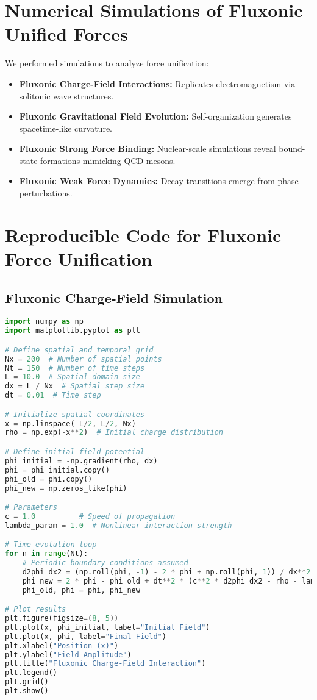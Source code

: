 \documentclass{article}
\begin{document}
\section{Numerical Simulations of Fluxonic Unified Forces}
We performed simulations to analyze force unification:
\begin{itemize}
    \item \textbf{Fluxonic Charge-Field Interactions:} Replicates electromagnetism via solitonic wave structures.
    \item \textbf{Fluxonic Gravitational Field Evolution:} Self-organization generates spacetime-like curvature.
    \item \textbf{Fluxonic Strong Force Binding:} Nuclear-scale simulations reveal bound-state formations mimicking QCD mesons.
    \item \textbf{Fluxonic Weak Force Dynamics:} Decay transitions emerge from phase perturbations.
\end{itemize}

\section{Reproducible Code for Fluxonic Force Unification}
\subsection{Fluxonic Charge-Field Simulation}
\begin{lstlisting}[language=Python, caption=Fluxonic Charge-Field Simulation, label=lst:charge]
import numpy as np
import matplotlib.pyplot as plt

# Define spatial and temporal grid
Nx = 200  # Number of spatial points
Nt = 150  # Number of time steps
L = 10.0  # Spatial domain size
dx = L / Nx  # Spatial step size
dt = 0.01  # Time step

# Initialize spatial coordinates
x = np.linspace(-L/2, L/2, Nx)
rho = np.exp(-x**2)  # Initial charge distribution

# Define initial field potential
phi_initial = -np.gradient(rho, dx)
phi = phi_initial.copy()
phi_old = phi.copy()
phi_new = np.zeros_like(phi)

# Parameters
c = 1.0          # Speed of propagation
lambda_param = 1.0  # Nonlinear interaction strength

# Time evolution loop
for n in range(Nt):
    # Periodic boundary conditions assumed
    d2phi_dx2 = (np.roll(phi, -1) - 2 * phi + np.roll(phi, 1)) / dx**2
    phi_new = 2 * phi - phi_old + dt**2 * (c**2 * d2phi_dx2 - rho - lambda_param * phi**3)
    phi_old, phi = phi, phi_new

# Plot results
plt.figure(figsize=(8, 5))
plt.plot(x, phi_initial, label="Initial Field")
plt.plot(x, phi, label="Final Field")
plt.xlabel("Position (x)")
plt.ylabel("Field Amplitude")
plt.title("Fluxonic Charge-Field Interaction")
plt.legend()
plt.grid()
plt.show()
\end{lstlisting}
\end{document}
